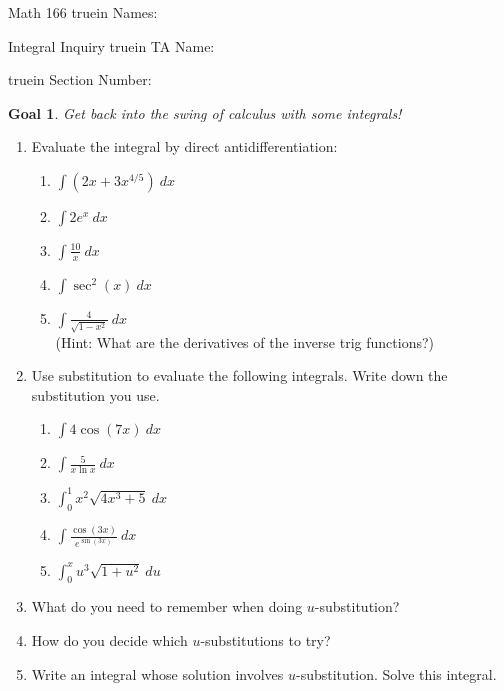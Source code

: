 \documentclass[12pt]{article}
\newtheorem*{goal}{Goal}
\begin{document}
\pagestyle{empty} %

\noindent
{Math 166    truein  Names:\ \hrulefill}

\noindent
{Integral Inquiry  truein  TA Name:\ \hrulefill}

  truein  Section Number:\ \hrulefill
\medskip

\begin{goal} \rm
Get back into the swing of calculus with some integrals!
\end{goal}
\smallskip

\begin{enumerate}
\item Evaluate the integral by direct antidifferentiation: 
\begin{enumerate}
\item
$\displaystyle\int \left(2x + 3x^{4/5}\right) \ dx$
\vfill
\item
$\displaystyle\int 2e^x \ dx$
\vfill
 \item
$\displaystyle\int \displaystyle\frac{10}{x} \ dx$
\vfill
\item
$\displaystyle\int \sec^2(x) \ dx$
\vfill
\item
$\displaystyle\int \displaystyle\frac{4}{\sqrt{1-x^2}}  \ dx$ \\(Hint: What are the derivatives of the inverse trig functions?)
\vfill
\vfill
\end{enumerate}



\item Use substitution to evaluate the following integrals. Write down the substitution you use.
\begin{enumerate}
\item $\displaystyle\int 4\cos(7x) \ dx$

\vspace{1.5in}

\item $\displaystyle\int \displaystyle\frac{5}{x \ln x} \ dx$

\vspace{1.5in}

\item $\displaystyle\int_0^1 x^2 \sqrt{4x^3+5} \ dx$

\vspace{1.5in}

\item $\displaystyle\int \displaystyle\frac{\cos(3x)}{e^{\sin(3x)}}\ dx$
\vspace{1.5in}
\item $\displaystyle \int_0^x u^3 \sqrt{1 + u^2} \ du$
\vspace{1.5in}
\end{enumerate} 

\item What do you need to remember when doing $u$-substitution? 
\vfill
\item How do you decide which $u$-substitutions to try?
\vfill

\item Write an integral whose solution involves $u$-substitution. Solve this integral.
\vfill
\vfill
\end{enumerate} 
\end{document}
